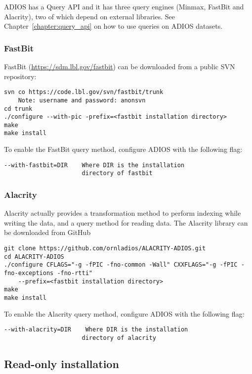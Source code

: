 ADIOS has a Query API and it has three query engines (Minmax, FastBit and Alacrity), two of which depend on external libraries. 
See Chapter~\ref{chapter:query_api} on how to use queries on ADIOS datasets. 

\subsubsection{FastBit}
FastBit (\url{https://sdm.lbl.gov/fastbit}) can be downloaded from a public SVN repository:

\begin{lstlisting}[language={}]
svn co https://code.lbl.gov/svn/fastbit/trunk
    Note: username and password: anonsvn
cd trunk
./configure --with-pic -prefix=<fastbit installation directory>
make
make install
\end{lstlisting}

\noindent To enable the FastBit query method, configure ADIOS with the following flag:
\begin{lstlisting}
--with-fastbit=DIR    Where DIR is the installation
                      directory of fastbit
\end{lstlisting}

\subsubsection{Alacrity}
Alacrity actually provides a transformation method to perform indexing while writing the data, and a query method for reading data. The Alacrity library can be downloaded from GitHub

\begin{lstlisting}[language={}]
git clone https://github.com/ornladios/ALACRITY-ADIOS.git
cd ALACRITY-ADIOS
./configure CFLAGS="-g -fPIC -fno-common -Wall" CXXFLAGS="-g -fPIC -fno-exceptions -fno-rtti" 
    --prefix=<fastbit installation directory>
make
make install
\end{lstlisting}

\noindent To enable the Alacrity query method, configure ADIOS with the following flag:
\begin{lstlisting}
--with-alacrity=DIR    Where DIR is the installation
                      directory of alacrity
\end{lstlisting}




\subsection{Read-only installation}

